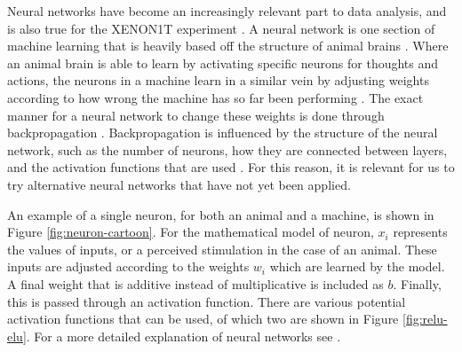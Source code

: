 \documentclass[../thesis.tex]{subfiles}
\begin{document}
Neural networks have become an increasingly relevant part to data analysis, and is also true for the XENON1T experiment \cite{Bart}.
A neural network is one section of machine learning that is heavily based off the structure of animal brains \cite{deep-learning}.
Where an animal brain is able to learn by activating specific neurons for thoughts and actions, the neurons in a machine learn in a similar vein by adjusting weights according to how wrong the machine has so far been performing \cite{deep-learning}.
The exact manner for a neural network to change these weights is done through backpropagation \cite{deep-learning}.
Backpropagation is influenced by the structure of the neural network, such as the number of neurons, how they are connected between layers, and the activation functions that are used \cite{deep-learning}.
For this reason, it is relevant for us to try alternative neural networks that have not yet been applied.

\par An example of a single neuron, for both an animal and a machine, is shown in Figure \ref{fig:neuron-cartoon}.
For the mathematical model of neuron, $x_i$ represents the values of inputs, or a perceived stimulation in the case of an animal.
These inputs are adjusted according to the weights $w_i$ which are learned by the model.
A final weight that is additive instead of multiplicative is included as $b$.
Finally, this is passed through an activation function.
There are various potential activation functions that can be used, of which two are shown in Figure \ref{fig:relu-elu}.
For a more detailed explanation of neural networks see \cite{neuron-cartoon}.
\end{document}
